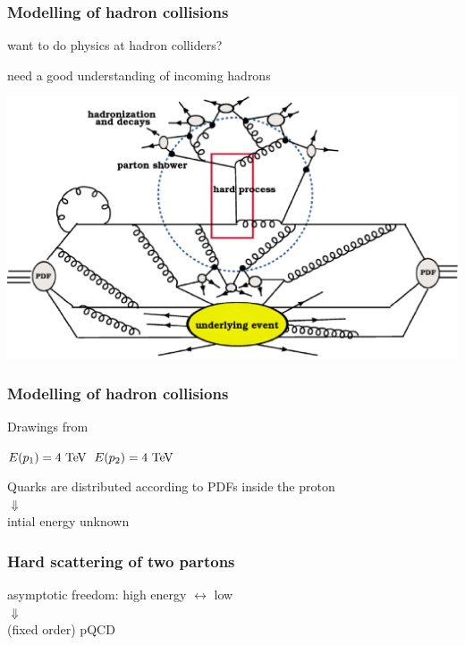 
\begin{frame}\frametitle{Modelling of hadron collisions}
\small\centering

want to do physics at hadron colliders?

need a good understanding of incoming hadrons

\myskip
\includegraphics[width=.7\textwidth]{../montecarlo/figures/my_collision}

\end{frame}

\begin{frame}\frametitle{Modelling of hadron collisions}

\begin{flushright}\tiny Drawings from~\cite{Gieseke}\end{flushright}

\centering\myskip

$E(p_1)=4\tev$ \hspace{.3\paperwidth} $E(p_2)=4\tev$

\vspace{.3\paperheight}

Quarks are distributed according to PDFs inside the proton\\
{\LARGE $\Downarrow$}\\
intial energy unknown

\end{frame}


\begin{frame}\frametitle{Hard scattering of two partons}
\centering\myskip


\vspace{.4\paperheight}

{\cccolor asymptotic freedom}: high energy $\longleftrightarrow$ low \alphas\\
{\LARGE $\Downarrow$}\\
(fixed order) pQCD

\end{frame}

